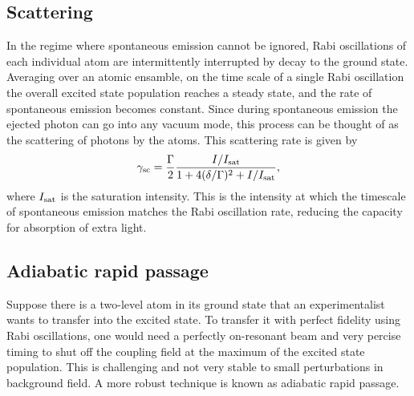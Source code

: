 \subsection{Scattering}\label{sec:scattering}
In the regime where spontaneous emission cannot be ignored, Rabi oscillations of each individual atom are intermittently interrupted by decay to the ground state. Averaging over an atomic ensamble, on the time scale of a single Rabi oscillation the overall excited state population reaches a steady state, and the rate of spontaneous emission becomes constant. Since during spontaneous emission the ejected photon can go into any vacuum mode, this process can be thought of as the scattering of photons by the atoms. This scattering rate is given by\cite{LCT}
\begin{equation}
\gamma_{\rm{sc}}= \frac{\Gamma}{2} \frac{I/I_{\rm{sat}}}{1+4(\delta/\Gamma)^2 +I/I_{\rm{sat}}},
\label{eq:scatrate}
\end{equation}
where $I_{\rm{sat}}$ is the saturation intensity. This is the intensity at which the timescale of spontaneous emission matches the Rabi oscillation rate, reducing the capacity for absorption of extra light.   

\subsection{Adiabatic rapid passage}\label{sec:ARP}

Suppose there is a two-level atom in its ground state that an experimentalist wants to transfer into the excited state. To transfer it with perfect fidelity using Rabi oscillations, one would need a perfectly on-resonant beam and very percise timing to shut off the coupling field at the maximum of the excited state population. This is challenging and not very stable to small perturbations in background field. A more robust technique is known as adiabatic rapid passage. 

